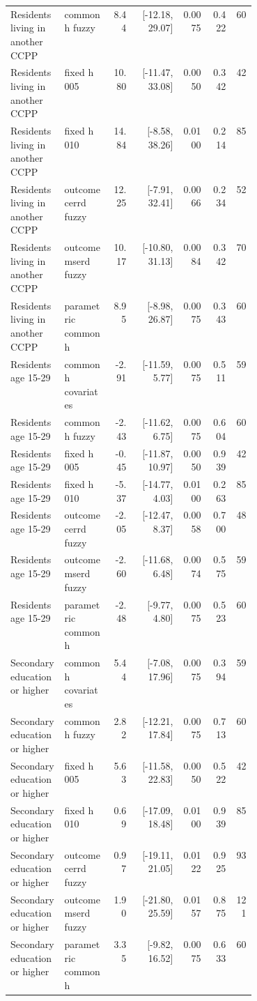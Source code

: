 \begin{longtable}{p{0.22\linewidth}p{0.19\linewidth}rrrrr}
Residents living in another CCPP & common h fuzzy & 8.44 & [-12.18, 29.07] & 0.0075 & 0.422 & 60 \\
Residents living in another CCPP & fixed h 005 & 10.80 & [-11.47, 33.08] & 0.0050 & 0.342 & 42 \\
Residents living in another CCPP & fixed h 010 & 14.84 & [-8.58, 38.26] & 0.0100 & 0.214 & 85 \\
Residents living in another CCPP & outcome cerrd fuzzy & 12.25 & [-7.91, 32.41] & 0.0066 & 0.234 & 52 \\
Residents living in another CCPP & outcome mserd fuzzy & 10.17 & [-10.80, 31.13] & 0.0084 & 0.342 & 70 \\
Residents living in another CCPP & parametric common h & 8.95 & [-8.98, 26.87] & 0.0075 & 0.343 & 60 \\
Residents age 15-29 & common h covariates & -2.91 & [-11.59, 5.77] & 0.0075 & 0.511 & 59 \\
Residents age 15-29 & common h fuzzy & -2.43 & [-11.62, 6.75] & 0.0075 & 0.604 & 60 \\
Residents age 15-29 & fixed h 005 & -0.45 & [-11.87, 10.97] & 0.0050 & 0.939 & 42 \\
Residents age 15-29 & fixed h 010 & -5.37 & [-14.77, 4.03] & 0.0100 & 0.263 & 85 \\
Residents age 15-29 & outcome cerrd fuzzy & -2.05 & [-12.47, 8.37] & 0.0058 & 0.700 & 48 \\
Residents age 15-29 & outcome mserd fuzzy & -2.60 & [-11.68, 6.48] & 0.0074 & 0.575 & 59 \\
Residents age 15-29 & parametric common h & -2.48 & [-9.77, 4.80] & 0.0075 & 0.523 & 60 \\
Secondary education or higher & common h covariates & 5.44 & [-7.08, 17.96] & 0.0075 & 0.394 & 59 \\
Secondary education or higher & common h fuzzy & 2.82 & [-12.21, 17.84] & 0.0075 & 0.713 & 60 \\
Secondary education or higher & fixed h 005 & 5.63 & [-11.58, 22.83] & 0.0050 & 0.522 & 42 \\
Secondary education or higher & fixed h 010 & 0.69 & [-17.09, 18.48] & 0.0100 & 0.939 & 85 \\
Secondary education or higher & outcome cerrd fuzzy & 0.97 & [-19.11, 21.05] & 0.0122 & 0.925 & 93 \\
Secondary education or higher & outcome mserd fuzzy & 1.90 & [-21.80, 25.59] & 0.0157 & 0.875 & 121 \\
Secondary education or higher & parametric common h & 3.35 & [-9.82, 16.52] & 0.0075 & 0.633 & 60 \\

\end{longtable}
